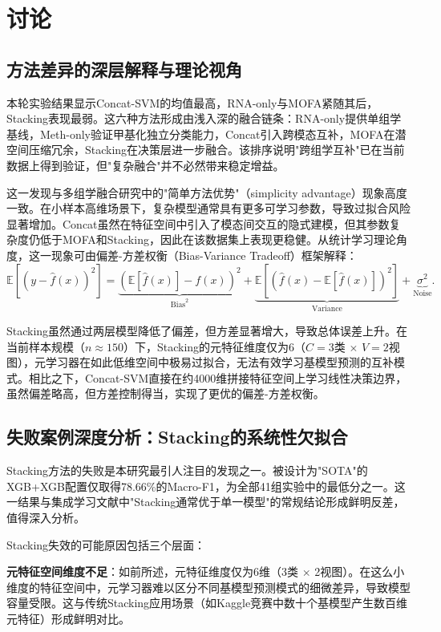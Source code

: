 \section{讨论}

\subsection{方法差异的深层解释与理论视角}

本轮实验结果显示Concat-SVM的均值最高，RNA-only与MOFA紧随其后，Stacking表现最弱。这六种方法形成由浅入深的融合链条：RNA-only提供单组学基线，Meth-only验证甲基化独立分类能力，Concat引入跨模态互补，MOFA在潜空间压缩冗余，Stacking在决策层进一步融合。该排序说明"跨组学互补"已在当前数据上得到验证，但"复杂融合"并不必然带来稳定增益。

这一发现与多组学融合研究中的"简单方法优势"（simplicity advantage）现象高度一致。在小样本高维场景下，复杂模型通常具有更多可学习参数，导致过拟合风险显著增加。Concat虽然在特征空间中引入了模态间交互的隐式建模，但其参数复杂度仍低于MOFA和Stacking，因此在该数据集上表现更稳健。从统计学习理论角度，这一现象可由偏差-方差权衡（Bias-Variance Tradeoff）框架解释：
\[
\mathbb{E}[(y - \hat{f}(x))^2] = \underbrace{(\mathbb{E}[\hat{f}(x)] - f(x))^2}_{\text{Bias}^2} + \underbrace{\mathbb{E}[(\hat{f}(x) - \mathbb{E}[\hat{f}(x)])^2]}_{\text{Variance}} + \underbrace{\sigma^2}_{\text{Noise}}.
\]

Stacking虽然通过两层模型降低了偏差，但方差显著增大，导致总体误差上升。在当前样本规模（$n \approx 150$）下，Stacking的元特征维度仅为6（$C=3$类 $\times$ $V=2$视图），元学习器在如此低维空间中极易过拟合，无法有效学习基模型预测的互补模式。相比之下，Concat-SVM直接在约4000维拼接特征空间上学习线性决策边界，虽然偏差略高，但方差控制得当，实现了更优的偏差-方差权衡。

\subsection{失败案例深度分析：Stacking的系统性欠拟合}

Stacking方法的失败是本研究最引人注目的发现之一。被设计为"SOTA"的XGB+XGB配置仅取得78.66\%的Macro-F1，为全部41组实验中的最低分之一。这一结果与集成学习文献中"Stacking通常优于单一模型"的常规结论形成鲜明反差，值得深入分析。

Stacking失效的可能原因包括三个层面：

\textbf{元特征空间维度不足}：如前所述，元特征维度仅为6维（3类 $\times$ 2视图）。在这么小维度的特征空间中，元学习器难以区分不同基模型预测模式的细微差异，导致模型容量受限。这与传统Stacking应用场景（如Kaggle竞赛中数十个基模型产生数百维元特征）形成鲜明对比。

